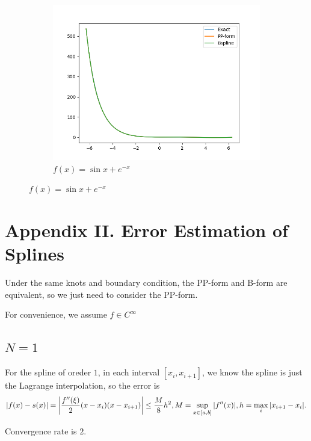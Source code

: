 \documentclass[a4paper]{article}
\begin{document}
\begin{figure}[H]
\begin{subfigure}[b]{0.45\textwidth}
        \centering
        \includegraphics[width=\textwidth]{../figure/SplineTest3.png}
        \caption{$f(x) = \sin x + e^{-x}$}
    \end{subfigure}
\end{figure}


\section{Appendix II. Error Estimation of Splines}

Under the same knots and boundary condition, the PP-form and B-form are equivalent,
so we just need to consider the PP-form.

For convenience, we assume $f \in C^{\infty}$

\subsection{$N=1$}
For the spline of oreder $1$, in each interval $[x_i, x_{i+1}]$, we know the spline is just the Lagrange interpolation,
so the error is 
\begin{equation}
    \abs{f(x) - s(x)} = \abs{\frac{f^{\prime \prime} (\xi)}{2} (x-x_i)(x-x_{i+1}) } \leq \frac{M}{8} h^2, M = \sup_{x \in [a,b]} \abs{f^{\prime \prime}(x)}, h = \max_{i} \abs{x_{i+1} - x_i}.
\end{equation}

Convergence rate is $2$.
\end{document}
